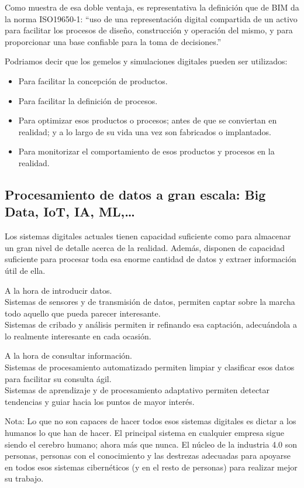 \documentclass[spanish,12pt,a4paper,final,oneside]{book}
\begin{document}
Como muestra de esa doble ventaja, es representativa la definición que de BIM da la norma ISO19650-1: ``uso de una representación digital compartida de un activo para facilitar los procesos de diseño, construcción y operación del mismo, y para proporcionar una base confiable para la toma de decisiones.''

Podriamos decir que los gemelos y simulaciones digitales pueden ser utilizados:
\begin{itemize}
\item Para facilitar la concepción de productos.
\item Para facilitar la definición de procesos.
\item Para optimizar esos productos o procesos; antes de que se conviertan en realidad; y a lo largo de su vida una vez son fabricados o implantados.
\item Para monitorizar el comportamiento de esos productos y procesos en la realidad.
\end{itemize}

\subsection{Procesamiento de datos a gran escala: Big Data, IoT, IA, ML,\ldots}
Los sistemas digitales actuales tienen capacidad suficiente como para almacenar un gran nivel de detalle acerca de la realidad. Además, disponen de capacidad suficiente para procesar toda esa enorme cantidad de datos y extraer información útil de ella.

A la hora de introducir datos.
\\Sistemas de sensores y de transmisión de datos, permiten captar sobre la marcha todo aquello que pueda parecer interesante.
\\Sistemas de cribado y análisis permiten ir refinando esa captación, adecuándola a lo realmente interesante en cada ocasión. 

A la hora de consultar información.
\\Sistemas de procesamiento automatizado permiten limpiar y clasificar esos datos para facilitar su consulta ágil.
\\Sistemas de aprendizaje y de procesamiento adaptativo permiten detectar tendencias y guiar hacia los puntos de mayor interés.

Nota: Lo que no son capaces de hacer todos esos sistemas digitales es dictar a los humanos lo que han de hacer. El principal sistema en cualquier empresa sigue siendo el cerebro humano; ahora más que nunca. El núcleo de la industria 4.0 son personas, personas con el conocimiento y las destrezas adecuadas para apoyarse en todos esos sistemas cibernéticos (y en el resto de personas) para realizar mejor su trabajo.
\end{document}

